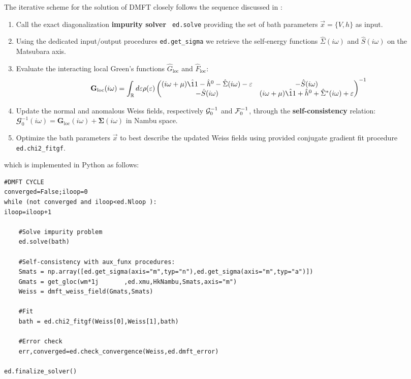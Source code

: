 \documentclass[edipack2.tex]{subfiles}
\begin{document}
The iterative scheme for the solution of DMFT closely follows the
sequence discussed in :   
\begin{enumerate}
\item Call the exact diagonalization {\bf impurity solver} {\tt
    ed.solve} providing the set of bath parameters $\vec{x}=\{V,h\}$  as input. 
\item Using the dedicated
  input/output procedures {\tt ed.get\_sigma} we retrieve the self-energy functions  
  $\hat{\Sigma}(i\omega)$ and $\hat{S}(i\omega)$ on the 
  Matsubara axis.
\item
  Evaluate the interacting local Green's functions $\hat{G}_\mathrm{loc}$ and
  $\hat{F}_\mathrm{loc}$:
  \begin{equation}
  {\mathbf G}_\mathrm{loc}(i\omega) =
  \int_\RRR d\e \rho(\e)
  \begin{pmatrix}
    (i\omega +\mu)\hat{\11} - \hat{h}^0 - \hat{\Sigma}(i\omega) -\e & -\hat{S}(i\omega) \\
    -\hat{S}(i\omega) & (i\omega +\mu)\hat{\11} + \hat{h}^0 +
    \hat{\Sigma}^*(i\omega) +\e\\
  \end{pmatrix}^{-1}
\end{equation}
\item Update the normal and anomalous Weiss fields, respectively 
  ${\cal G}_0^{-1}$ and ${\cal F}_0^{-1}$, through the {\bf self-con\-sis\-ten\-cy}
    relation: $\mathbfcal{G}^{-1}_0(i\omega) = {\mathbf G}_\mathrm{loc}(i\omega) +
    {\mathbf \Sigma}(i\omega)$ in Nambu space. 
  \item Optimize the bath parameters $\vec{x}$ to best describe the  updated
    Weiss fields using \NAME provided conjugate gradient  fit
    procedure {\tt ed.chi2\_fitgf}.
\end{enumerate}
which is implemented in Python as follows:
\begin{lstlisting}[style=mypython,numbers=none,basicstyle={\scriptsize\ttfamily}]
#DMFT CYCLE
converged=False;iloop=0
while (not converged and iloop<ed.Nloop ):
iloop=iloop+1

    #Solve impurity problem
    ed.solve(bath)
    
    #Self-consistency with aux_funx procedures:
    Smats = np.array([ed.get_sigma(axis="m",typ="n"),ed.get_sigma(axis="m",typ="a")])    
    Gmats = get_gloc(wm*1j       ,ed.xmu,HkNambu,Smats,axis="m") 
    Weiss = dmft_weiss_field(Gmats,Smats)                  
          
    #Fit
    bath = ed.chi2_fitgf(Weiss[0],Weiss[1],bath)

    #Error check
    err,converged=ed.check_convergence(Weiss,ed.dmft_error)

ed.finalize_solver()
\end{lstlisting}
\end{document}
